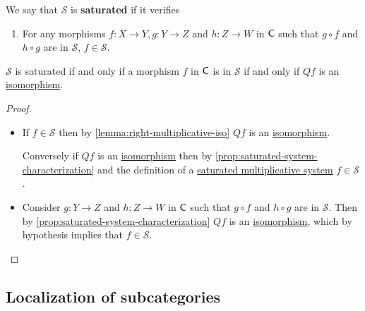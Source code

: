 \documentclass[../../main]{subfiles}
\begin{document}
\begin{definition}\label{def:saturated-multiplicative-system}
  We say that \(\mathcal{S}\) is \textbf{saturated} if it verifies
  \begin{enumerate}
    \item[S.5)] For any morphisms \(f: X \to Y, g: Y \to Z\) and \(h: Z \to W\) in \(\mathsf{C}\) such that \(g \circ f\) and \(h \circ g\) are in \(\mathcal{S}\), \(f \in \mathcal{S}\).
  \end{enumerate}
\end{definition}

\begin{corollary}
  \(\mathcal{S}\) is saturated if and only if a morphism \(f\) in \(\mathsf{C}\) is in \(\mathcal{S}\) if and only if \(Qf\) is an \hyperref[def:categorical-isomorphism]{isomorphism}.
\end{corollary}
\begin{proof}~
 \begin{itemize}
   \item[\(\implies\)] If \(f \in \mathcal{S}\) then by \autoref{lemma:right-multiplicative-iso} \(Qf\) is an \hyperref[def:categorical-isomorphism]{isomorphism}.

         Conversely if \(Qf\) is an \hyperref[def:categorical-isomorphism]{isomorphism} then by \autoref{prop:saturated-system-characterization} and the definition of a \hyperref[def:saturated-multiplicative-system]{saturated multiplicative system} \(f \in \mathcal{S}\).
   \item[\(\impliedby\)] Consider \(g: Y \to Z\) and \(h: Z \to W\) in \(\mathsf{C}\) such that \(g \circ f\) and \(h \circ g\) are in \(\mathcal{S}\).
         Then by \autoref{prop:saturated-system-characterization} \(Qf\) is an \hyperref[def:categorical-isomorphism]{isomorphism}, which by hypothesis implies that \(f \in \mathcal{S}\).
 \end{itemize} 
\end{proof}

\subsection{Localization of subcategories}
\end{document}
